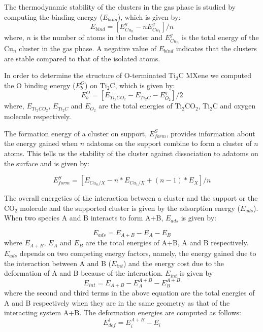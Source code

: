 The thermodynamic stability of the clusters in the gas phase is studied by computing the binding energy ($E_{bind}$),
which is given by:
\begin{equation}
 E_{bind} = [E^{g}_{Cu{_n}}-{nE^{g}_{Cu{_1}}}]/n
 \label{Ebind}
\end{equation}
where, $n$ is the number of atoms in the cluster and $E^{g}_{Cu_n}$ is the total energy of the 
Cu$_n$ cluster in the gas phase. A negative value of $E_{bind}$ indicates that the clusters are stable compared to that of the isolated atoms.

In order to determine the structure of O-terminated Ti$_2$C MXene we computed the O binding energy ($E^O_{b}$) on 
Ti$_2$C, which is given by:
\begin{equation}
 E^O_{b} = [E_{Ti_2CO_2} - E_{Ti_2C} - E^{g}_{O_2}]/2 
 \label{ebindO}
\end{equation}
where, $E_{Ti_2CO_2}$, $E_{Ti_2C}$ and $E_{O_2}$ are the total energies of Ti$_2$CO$_2$, Ti$_2$C and oxygen molecule respectively.

The formation energy of a 
cluster on support, $E_{form}^S$, provides information about the energy gained when $n$ adatoms
on the support combine to form a cluster of $n$ atoms. This tells us
the stability of the cluster against dissociation to adatoms on the surface and is given by:

\begin{equation}
 E_{form}^S = [E_{Cu{_n}/X} - n*E_{Cu{_1}/X} + (n-1)* E_{X}]/n
 \label{Ef}
\end{equation}

The overall energetics of the interaction between a cluster and the support or the CO$_2$ molecule
and the supported cluster is given by the adsorption energy ($E_{ads}$). When two species A and B
interacts to form A+B, $E_{ads}$ is given by:

\begin{equation}
 E_{ads} = E_{A+B} - E_{A} - E_{B}
 \label{eads}
\end{equation}
\noindent where $E_{A+B}$, $E_A$ and $E_B$ are the total energies of A+B, A and B respectively.
$E_{ads}$ depends on two competing energy factors, namely, the energy gained due to the interaction between
A and B ($E_{int}$) and the energy cost due to the deformation of A and B because of the interaction.
$E_{int}$ is given by
\begin{equation}
    E_{int}=E_{A+B} - E^{A+B}_A - E^{A+B}_B
     \label{eint}
\end{equation}
\noindent where the second and third terms in the above equation are the total energies of
A and B respectively when they are in the same geometry as that of the interacting
system A+B. The deformation energies are computed as follows:
\begin{equation}
 E^{i}_{def} = E^{A+B}_{i} - E_i
 \label{Edef-s}
\end{equation}

